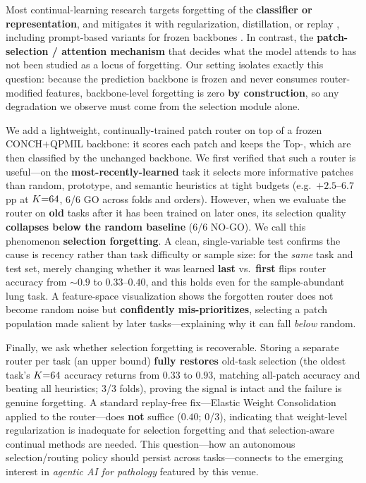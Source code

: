 Most continual-learning research targets forgetting of the \textbf{classifier
or representation}, and mitigates it with regularization, distillation, or
replay \cite{kirkpatrick2017ewc,li2017lwf,rebuffi2017icarl}, including
prompt-based variants for frozen backbones
\cite{wang2022l2p,wang2022dualprompt}. In contrast, the
\textbf{patch-selection / attention mechanism} that decides what the model
attends to has not been studied as a locus of forgetting. Our setting isolates
exactly this question: because the prediction backbone is frozen and never
consumes router-modified features, backbone-level forgetting is zero
\textbf{by construction}, so any degradation we observe must come from the
selection module alone.

We add a lightweight, continually-trained patch router on top of a frozen
CONCH$+$QPMIL backbone: it scores each patch and keeps the Top-\K{}, which are
then classified by the unchanged backbone. We first verified that such a
router is useful---on the \textbf{most-recently-learned} task it selects more
informative patches than random, prototype, and semantic heuristics at tight
budgets (e.g.\ $+2.5$--$6.7$\,pp at $K{=}64$, 6/6 GO across folds and orders).
However, when we evaluate the router on \textbf{old} tasks after it has been
trained on later ones, its selection quality \textbf{collapses below the random
baseline} (6/6 NO-GO). We call this phenomenon \textbf{selection forgetting}. A
clean, single-variable test confirms the cause is recency rather than task
difficulty or sample size: for the \emph{same} task and test set, merely
changing whether it was learned \textbf{last} vs.\ \textbf{first} flips router
accuracy from ${\sim}0.9$ to $0.33$--$0.40$, and this holds even for the
sample-abundant lung task. A feature-space visualization shows the forgotten
router does not become random noise but \textbf{confidently mis-prioritizes},
selecting a patch population made salient by later tasks---explaining why it
can fall \emph{below} random.

Finally, we ask whether selection forgetting is recoverable. Storing a
separate router per task (an upper bound) \textbf{fully restores} old-task
selection (the oldest task's $K{=}64$ accuracy returns from $0.33$ to $0.93$,
matching all-patch accuracy and beating all heuristics; 3/3 folds), proving the
signal is intact and the failure is genuine forgetting. A standard replay-free
fix---Elastic Weight Consolidation applied to the router---does \textbf{not}
suffice ($0.40$; 0/3), indicating that weight-level regularization is
inadequate for selection forgetting and that selection-aware continual methods
are needed. This question---how an autonomous selection/routing policy should
persist across tasks---connects to the emerging interest in
\emph{agentic AI for pathology} featured by this venue.

